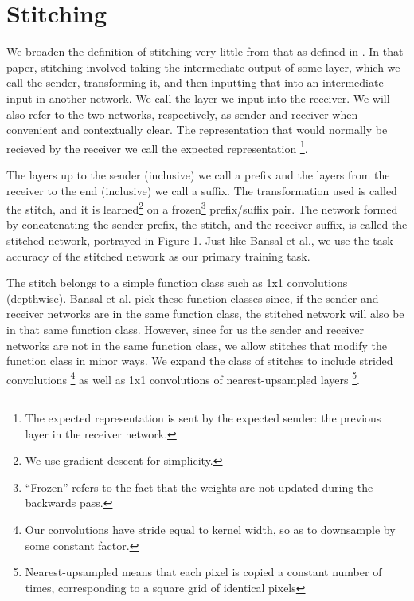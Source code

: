 \documentclass{article} %
\begin{document}
\section{Stitching}
\label{Stitching}
We broaden the definition of stitching very little from that as defined in \cite{Bansal2021RevisitingMS}. In that paper,
stitching involved taking the intermediate output of some layer, which we call the sender, transforming it, and then
inputting that into an intermediate input in another network. We call the layer we input into the receiver. We
will also refer to the two networks, respectively, as sender and receiver when convenient and contextually clear.
The representation that would normally be recieved by the receiver we call the expected representation
\footnote{The expected representation is sent by
the expected sender: the previous layer in the receiver network.}.

The layers up to the sender (inclusive) we call a prefix and the layers from the receiver to the end (inclusive) we call
a suffix. The transformation used is called the stitch, and it is learned\footnote{We use gradient descent for simplicity.}
on a frozen\footnote{``Frozen'' refers to the fact that the weights are not updated during the backwards pass.}
prefix/suffix pair. The network formed by concatenating the sender prefix, the stitch, and the receiver
suffix, is called the stitched network, portrayed in \hyperref[Figure1]{Figure 1}. Just like Bansal et al., we use the task accuracy of the stitched network as our
primary training task.

The stitch belongs to a simple function class such as 1x1 convolutions (depthwise).
Bansal et al. pick these function classes since, if the sender and receiver networks are in the same
function class, the stitched network will also be in that same function class. However, since for us the sender and
receiver networks are not in the same function class, we allow stitches that modify the function class in minor ways.
We expand the class of stitches to include strided convolutions
\footnote{Our convolutions have stride equal to kernel width, so as to downsample
by some constant factor.} as well as 1x1 convolutions of nearest-upsampled layers
\footnote{Nearest-upsampled means that each pixel
is copied a constant number of times, corresponding to a square grid of identical pixels}.
\end{document}
